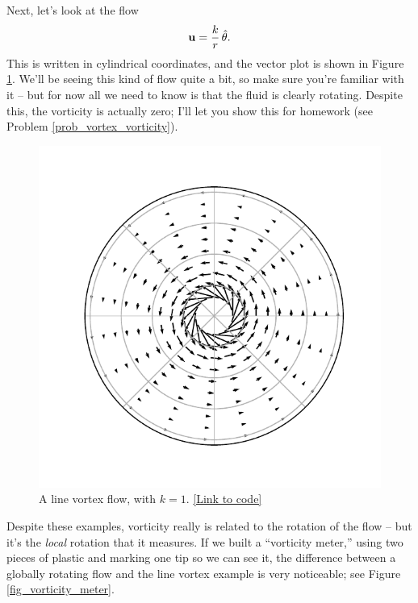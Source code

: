 \begin{example}
\label{ex_vorticity_line_vortex}
Next, let's look at the flow
\begin{equation}
\mathbf{u} = \frac{k}{r} \, \hat{\theta}.
\end{equation}
This is written in cylindrical coordinates, and the vector plot is shown in Figure \ref{fig_vortex}.  We'll be seeing this kind of flow quite a bit, so make sure you're familiar with it -- but for now all we need to know is that the fluid is clearly rotating.  Despite this, the vorticity is actually zero; I'll let you show this for homework (see Problem \ref{prob_vortex_vorticity}).
\end{example}

\begin{figure}
\centering
\includegraphics[width=0.5\linewidth]{Figures/Chapter1/fig_line_vortex_vector}
\caption{A line vortex flow, with $k = 1$. \href{https://nbviewer.jupyter.org/github/josephmacmillan/IntroFluidDynamics/blob/master/Jupyter/1-Introduction.ipynb\#Figure-1.6:--Line-vortex}{[Link to code]}}
\label{fig_vortex}
\end{figure}

Despite these examples, vorticity really is related to the rotation of the flow -- but it's the \emph{local} rotation that it measures.  If we built a ``vorticity meter,'' using two pieces of plastic and marking one tip so we can see it, the difference between a globally rotating flow and the line vortex example is very noticeable; see Figure \ref{fig_vorticity_meter}.

